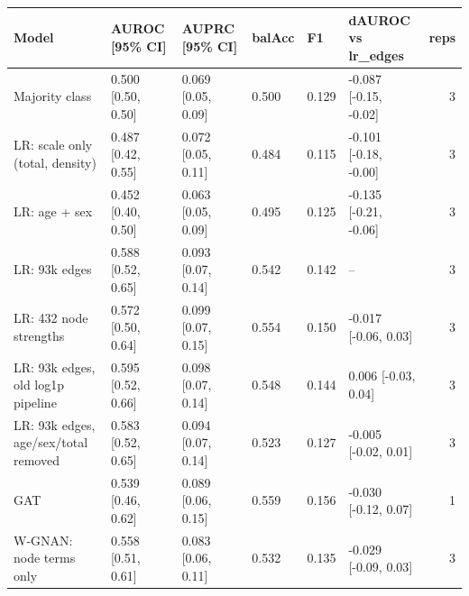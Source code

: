 \begin{tabular}{llllllr}
\toprule
Model & AUROC [95\% CI] & AUPRC [95\% CI] & balAcc & F1 & dAUROC vs lr\_edges & reps \\
\midrule
Majority class & 0.500 [0.50, 0.50] & 0.069 [0.05, 0.09] & 0.500 & 0.129 & -0.087 [-0.15, -0.02] & 3 \\
LR: scale only (total, density) & 0.487 [0.42, 0.55] & 0.072 [0.05, 0.11] & 0.484 & 0.115 & -0.101 [-0.18, -0.00] & 3 \\
LR: age + sex & 0.452 [0.40, 0.50] & 0.063 [0.05, 0.09] & 0.495 & 0.125 & -0.135 [-0.21, -0.06] & 3 \\
LR: 93k edges & 0.588 [0.52, 0.65] & 0.093 [0.07, 0.14] & 0.542 & 0.142 & -- & 3 \\
LR: 432 node strengths & 0.572 [0.50, 0.64] & 0.099 [0.07, 0.15] & 0.554 & 0.150 & -0.017 [-0.06, 0.03] & 3 \\
LR: 93k edges, old log1p pipeline & 0.595 [0.52, 0.66] & 0.098 [0.07, 0.14] & 0.548 & 0.144 & 0.006 [-0.03, 0.04] & 3 \\
LR: 93k edges, age/sex/total removed & 0.583 [0.52, 0.65] & 0.094 [0.07, 0.14] & 0.523 & 0.127 & -0.005 [-0.02, 0.01] & 3 \\
GAT & 0.539 [0.46, 0.62] & 0.089 [0.06, 0.15] & 0.559 & 0.156 & -0.030 [-0.12, 0.07] & 1 \\
W-GNAN: node terms only & 0.558 [0.51, 0.61] & 0.083 [0.06, 0.11] & 0.532 & 0.135 & -0.029 [-0.09, 0.03] & 3 \\
\bottomrule
\end{tabular}
